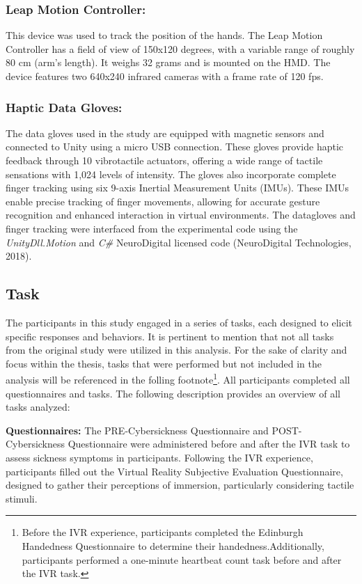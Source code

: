 \documentclass[12pt,oneside,openright]{report}
\begin{document}
\subsubsection*{Leap Motion Controller:}
This device was used to track the position of the hands. The Leap Motion Controller has a field of view of 150x120 degrees, with a variable range of roughly 80 cm (arm's length). It weighs 32 grams and is mounted on the HMD. The device features two 640x240 infrared cameras with a frame rate of 120 fps.

\subsubsection*{Haptic Data Gloves:}
The data gloves used in the study are equipped with magnetic sensors and connected to Unity using a micro USB connection. These gloves provide haptic feedback through 10 vibrotactile actuators, offering a wide range of tactile sensations with 1,024 levels of intensity. The gloves also incorporate complete finger tracking using six 9-axis Inertial Measurement Units (IMUs). These IMUs enable precise tracking of finger movements, allowing for accurate gesture recognition and enhanced interaction in virtual environments. The datagloves and finger tracking were interfaced from the experimental code using the \textit{UnityDll.Motion} and \textit{C\#} NeuroDigital licensed code (NeuroDigital Technologies, 2018).


\subsection*{Task}

The participants in this study engaged in a series of tasks, each designed to elicit specific responses and behaviors. It is pertinent to mention that not all tasks from the original study were utilized in this analysis. For the sake of clarity and focus within the thesis, tasks that were performed but not included in the analysis will be referenced in the folling footnote\footnote{Before the IVR experience, participants completed the Edinburgh Handedness Questionnaire to determine their handedness.Additionally, participants performed a one-minute heartbeat count task before and after the IVR task.}. All participants completed all questionnaires and tasks. The following description provides an overview of all tasks analyzed:

\textbf{Questionnaires:}  The PRE-Cybersickness Questionnaire and POST-Cybersickness Questionnaire were administered before and after the IVR task to assess sickness symptoms in participants. Following the IVR experience, participants filled out the Virtual Reality Subjective Evaluation Questionnaire, designed to gather their perceptions of immersion, particularly considering tactile stimuli.
\end{document}
